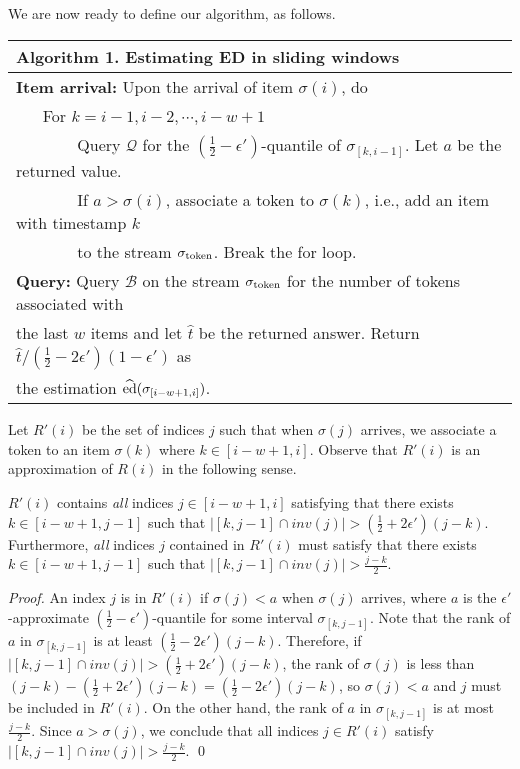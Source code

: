 \documentclass{llncs}
\newcommand{\ed}{{\rm ed}}
\newcommand{\aed}{\widehat \ed}
\begin{document}
We are now ready to define our algorithm, as follows.
\begin{center}
\vspace{-.1in}
  \begin{tabular}{l}
    \hline
    {\bf Algorithm 1.} Estimating ED in sliding windows\\
    \hline
    {\bf Item arrival:} Upon the arrival of item $\sigma(i)$, do \\
    ~ ~ For $k=i-1,i-2,\cdots,i-w+1$\\
    ~ ~ ~ ~ ~Query $\mathcal{Q}$ for the $(\frac{1}{2}-\epsilon')$-quantile of $\sigma_{[k, i-1]}$.
             Let $a$ be the returned value.\\
    ~ ~ ~ ~ ~If $a>\sigma(i)$,
    associate a token to $\sigma(k)$, i.e., add an item with timestamp $k$\\
    ~ ~ ~ ~ ~to the stream $\sigma_{\rm token}$.
                  Break the for loop. \vspace{.1in}\\
   {\bf Query:}
   Query $\mathcal{B}$ on the stream $\sigma_{\rm token}$ for the number of tokens associated
   with\\
   the last $w$ items and
   let $\hat t$ be the returned answer.
   Return $\hat t / (\frac{1}{2}-2\epsilon')( 1-\epsilon')$ as\\
   the estimation $\aed( \sigma_{[i-w+1,i]})$.   \\
    \hline
  \end{tabular}
\end{center}

Let $R'(i)$ be
the set of indices $j$ such that
when $\sigma(j)$ arrives, we associate a token
to an item $\sigma(k)$ where $k \in [i-w+1, i]$.
Observe that $R'(i)$ is an approximation of $R(i)$
in the following sense.

\begin{lemma}\label{lem:R'}
$R'(i)$ contains \emph{all} indices $j \in [i-w+1, i]$ satisfying
that there exists $k \in [i-w+1, j-1]$ such that
$|[k, j-1]\cap inv(j)| > (\frac{1}{2} + 2\epsilon')(j-k)$.
Furthermore, \emph{all} indices $j$ contained in
$R'(i)$ must satisfy that
there exists $k \in [i-w+1, j-1]$ such that
$|[k, j-1]\cap inv(j)| > \frac{j-k}{2}$.
\end{lemma}

\begin{proof}
An index $j$ is in $R'(i)$ if
$\sigma(j) < a$ when $\sigma(j)$ arrives, where
$a$ is the $\epsilon'$-approximate $(\frac{1}{2} - \epsilon')$-quantile
for some interval $\sigma_{[k, j-1]}$. Note that the rank of $a$
in $\sigma_{[k,j-1]}$ is at least $(\frac{1}{2} - 2\epsilon')(j-k)$.
Therefore, if $|[k, j-1]\cap inv(j)| > (\frac{1}{2} + 2\epsilon')(j-k)$,
the rank of $\sigma(j)$ is less than $(j-k) - (\frac{1}{2} + 2\epsilon')(j-k)
= (\frac{1}{2} - 2\epsilon')(j-k)$,
so $\sigma(j) < a$ and $j$ must be included in $R'(i)$.
On the other hand,
the rank of $a$ in $\sigma_{[k,j-1]}$ is at most $\frac{j-k}{2}$.
Since $a > \sigma(j)$, we conclude that
all indices $j \in R'(i)$ satisfy $|[k, j-1]\cap inv(j)| > \frac{j-k}{2}$.
\hfill\qed
\end{proof}
\end{document}
